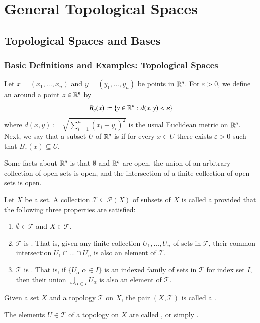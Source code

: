 \documentclass[12pt, a4paper, oneside, openright, titlepage]{book}
\begin{document}
\tableofcontents

\part{General Topological Spaces}

\chapter{\textsection Topological Spaces and Bases}

\section{Basic Definitions and Examples: Topological Spaces}


\begin{cust}
    Let $x = (x_1,...,x_n)$ and $y=(y_1,...,y_n)$ be points in $\mathbb R^n$. For $\varepsilon > 0$, we define an  around a point $x \in \mathbb R^n$ by \begin{equation*}
        B_{\varepsilon}(x) := \{y \in \mathbb R^n:d(x,y) < \varepsilon\}
    \end{equation*}
    where $d(x,y):=\sqrt{\sum_{i=1}^n(x_i-y_i)^2}$ is the usual Euclidean metric on $\mathbb R^n$. Next, we say that a subset $U$ of $\mathbb R^n$ is  if for every $x \in U$ there exists $\varepsilon > 0$ such that $B_{\varepsilon}(x) \subseteq U$. 

    Some facts about $\mathbb R^n$ is that $\emptyset$ and $\mathbb R^n$ are open, the union of an arbitrary collection of open sets is open, and the intersection of a finite collection of open sets is open. 
\end{cust}

\begin{defn}
    Let $X$ be a set. A collection $\mathcal{T} \subseteq \mathcal{P}(X)$ of subsets of $X$ is called a  provided that the following three properties are satisfied: \begin{enumerate}
        \item $\emptyset \in \mathcal{T}$ and $X \in \mathcal{T}$.
        \item $\mathcal{T}$ is . That is, given any finite collection $U_1,...,U_n$ of sets in $\mathcal{T}$, their common intersection $U_1\cap ...\cap U_n$ is also an element of $\mathcal{T}$.
        \item $\mathcal{T}$ is . That is, if $\{U_{\alpha}\vert\alpha\in I\}$ is an indexed family of sets in $\mathcal{T}$ for index set $I$, then their union $\bigcup_{\alpha \in I}U_{\alpha}$ is also an element of $\mathcal{T}$.
    \end{enumerate}
    Given a set $X$ and a topology $\mathcal{T}$ on $X$, the pair $(X,\mathcal{T})$ is called a . 


    The elements $U \in \mathcal{T}$ of a topology on $X$ are called , or simply .
\end{defn}
\end{document}
